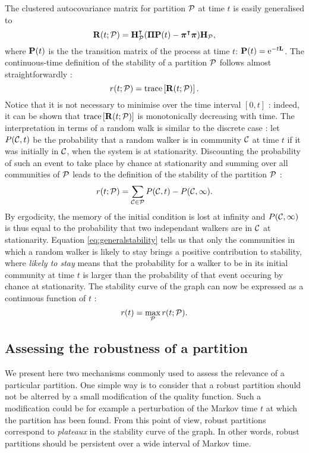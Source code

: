 The clustered autocovariance matrix for partition $\P$ at time $t$ is easily generalised to 
\begin{equation}
	\b R(t;\P) = \b H_{\P}^{\t}(\b \Pi\b P(t) - \bs \pi^{\t}\bs \pi)\b H_{\P},
\end{equation}
where $\b P(t)$ is the the transition matrix of the process at time $t$: $\b P(t) = \Exp^{-t\b L}$. The continuous-time definition of the stability of a partition $\P$ follows almost straightforwardly :
\begin{equation}
	r(t;\P) = \trace \left[ \b R(t; \P) \right].
\end{equation}
Notice that it is not necessary to minimise over the time interval $[0,t]$ : indeed, it can be shown that $\trace \left[ \b R(t;\P) \right]$ is monotonically decreasing with time. The interpretation in terms of a random walk is similar to the discrete case : let $P(\C,t)$ be the probability that a random walker is in community $\C$ at time $t$ if it was initially in $\C$, when the system is at stationarity. Discounting the probability of such an event to take place by chance at stationarity and summing over all communities of $\P$ leads to the definition of the stability of the partition $\P$ :
\begin{equation} \label{eq:generalstability}
	r(t;\P) = \sum_{\C \in \P} P(\C,t) - P(\C,\infty).
\end{equation}
By ergodicity, the memory of the initial condition is lost at infinity and $P(\C,\infty)$ is thus equal to the probability that two independant walkers are in $\C$ at stationarity. Equation \eqref{eq:generalstability} tells us that only the communities in which a random walker is likely to stay brings a positive contribution to stability, where \textit{likely to stay} means that the probability for a walker to be in its initial community at time $t$ is larger than the probability of that event occuring by chance at stationarity. The stability curve of the graph can now be expressed as a continuous function of $t$ :
\begin{equation}
	r(t) = \max_{\P} r(t;\P).
\end{equation}


\subsection{Assessing the robustness of a partition}
We present here two mechanisms commonly used to assess the relevance of a particular partition. One simple way is to consider that a robust partition should not be alterred by a small modification of the quality function. Such a modification could be for example a perturbation of the Markov time $t$ at which the partition has been found. From this point of view, robust partitions correspond to \textit{plateaux} in the stability curve of the graph. In other words, robust partitions should be persistent over a wide interval of Markov time.

